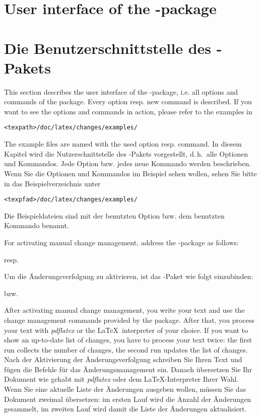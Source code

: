 \ifENGLISH
	\section{User interface of the -package}
\fi
	\ifGERMAN
		\section{Die Benutzerschnittstelle des -Pakets}
	\fi
\label{sec:user}

\ifENGLISH
	This section describes the user interface of the -package, i.e. all options and commands of the package.
	Every option resp. new command is described.
	If you want to see the options and commands in action, please refer to the examples in

	\texttt{<texpath>/doc/latex/changes/examples/}

	The example files are named with the used option resp. command.
\fi
	\ifGERMAN
		In diesem Kapitel wird die Nutzerschnittstelle des -Pakets vorgestellt, d.\,h.\ alle Optionen und Kommandos.
		Jede Option bzw. jedes neue Kommando werden beschrieben.
		Wenn Sie die Optionen und Kommandos im Beispiel sehen wollen, sehen Sie bitte in das Beispielverzeichnis unter

		\texttt{<texpfad>/doc/latex/changes/examples/}

		Die Beispieldateien sind mit der benutzten Option bzw. dem benutzten Kommando benannt.
	\fi

\ifENGLISH
	For activating manual change management, address the -package as follows:


	resp.

\fi
	\ifGERMAN
		Um die Änderungsverfolgung zu aktivieren, ist das -Paket wie folgt einzubinden:


		bzw.

	\fi

\ifENGLISH
	After activating manual change management, you write your text and use the change management commands provided by the package.
	After that, you process your text with \emph{pdflatex} or the \LaTeX\ interpreter of your choice.
	If you want to show an up-to-date list of changes, you have to process your text twice: the first run collects the number of changes, the second run updates the list of changes.
\fi
	\ifGERMAN
		Nach der Aktivierung der Änderungsverfolgung schreiben Sie Ihren Text und fügen die Befehle für das Änderungsmanagement ein.
		Danach übersetzen Sie Ihr Dokument wie gehabt mit \emph{pdflatex} oder dem \LaTeX-Interpreter Ihrer Wahl.
		Wenn Sie eine aktuelle Liste der Änderungen ausgeben wollen, müssen Sie das Dokument zweimal übersetzen: im ersten Lauf wird die Anzahl der Änderungen gesammelt, im zweiten Lauf wird damit die Liste der Änderungen aktualisiert.
	\fi

